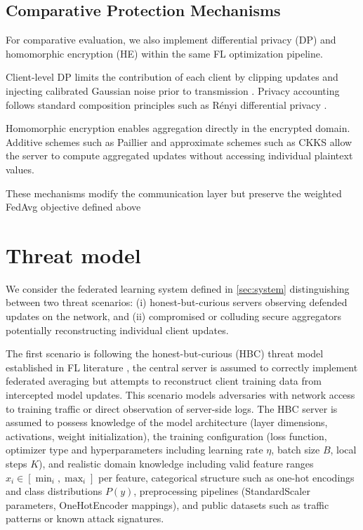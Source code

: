 \documentclass[journal,twoside,web]{ieeecolor}
\begin{document}
\subsection{Comparative Protection Mechanisms}

For comparative evaluation, we also implement differential privacy (DP) and homomorphic encryption (HE) within the same FL optimization pipeline.

Client-level DP limits the contribution of each client by clipping updates and injecting calibrated Gaussian noise prior to transmission \cite{dwork2014dp,abadi2016dp}. Privacy accounting follows standard composition principles such as Rényi differential privacy \cite{mironov2017rdp}.

Homomorphic encryption enables aggregation directly in the encrypted domain. Additive schemes such as Paillier \cite{paillier1999} and approximate schemes such as CKKS \cite{cheon2017ckks} allow the server to compute aggregated updates without accessing individual plaintext values.

These mechanisms modify the communication layer but preserve the weighted FedAvg objective defined above


\section{Threat model}
\label{sec:threat}

We consider the federated learning system defined in \ref{sec:system}  distinguishing between two  threat scenarios: (i) honest-but-curious servers observing defended updates on the network, and (ii) compromised or colluding secure aggregators potentially reconstructing individual client updates. 

The first scenario is following the honest-but-curious (HBC) threat model established in FL literature , the central server is assumed to correctly implement federated averaging but attempts to reconstruct client training data from intercepted model updates. This scenario models adversaries with network access to training traffic or direct observation of server-side logs. 
The HBC server is assumed to possess knowledge of the model architecture (layer dimensions, activations, weight initialization), the training configuration (loss function, optimizer type and hyperparameters including learning rate $\eta$, batch size $B$, local steps $K$), and realistic domain knowledge including valid feature ranges $x_i \in [\min_i, \max_i]$ per feature, categorical structure such as one-hot encodings and class distributions $P(y)$, preprocessing pipelines (StandardScaler parameters, OneHotEncoder mappings), and public datasets such as traffic patterns or known attack signatures.
\end{document}
